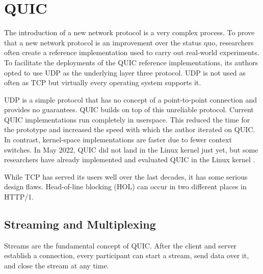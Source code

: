\documentclass[conference]{IEEEtran}
\begin{document}
\section{QUIC}

The introduction of a new network protocol is a very complex process. To prove that a new network protocol is an improvement over the status quo, researchers often create a reference implementation used to carry out real-world experiments. To facilitate the deployments of the QUIC reference implementations, its authors opted to use UDP as the underlying layer three protocol. UDP is not used as often as TCP but virtually every operating system supports it.

UDP is a simple protocol that has no concept of a point-to-point connection and provides no guarantees. QUIC builds on top of this unreliable protocol. Current QUIC implementations run completely in userspace. This reduced the time for the prototype and increased the speed with which the author iterated on QUIC. In contrast, kernel-space implementations are faster due to fewer context switches. In May 2022, QUIC did not land in the Linux kernel just yet, but some researchers have already implemented and evaluated QUIC in the Linux kernel \cite{Kernel}.

While TCP has served its users well over the last decades, it has some serious design flaws. Head-of-line blocking (HOL) can occur in two different places in HTTP/1.



\subsection{Streaming and Multiplexing}

Streams are the fundamental concept of QUIC. After the client and server establish a connection, every participant can start a stream, send data over it, and close the stream at any time. 
\end{document}
